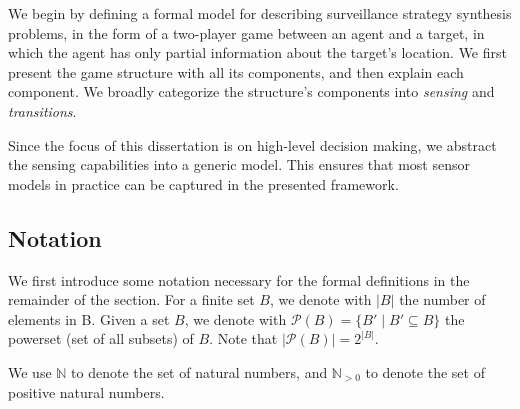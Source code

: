 We begin by defining a formal model for describing surveillance strategy synthesis problems, in the form of a two-player game between an agent and a target, in which the agent has only partial information about the target's location. We first present the game structure with all its components, and then explain each component. We broadly categorize the structure's components into \emph{sensing} and \emph{transitions}. 

Since the focus of this dissertation is on high-level decision making, we abstract the sensing capabilities into a generic model. This ensures that most sensor models in practice can be captured in the presented framework. 

\subsection{Notation}\label{sec:notation}
We first introduce some notation necessary for the formal definitions in the remainder of the section. For a finite set $B$, we denote with $|B|$ the number of elements in B. Given a set $B$, we denote with $\mathcal{P}(B) = \{B' \mid B'\subseteq B\}$ the powerset (set of all subsets) of $B$. Note that $|\mathcal{P}(B)|=2^{|B|}$. 

We use $\mathbb N$ to denote the set of natural numbers, and $\mathbb N_{>0}$ to denote the set of positive natural numbers.


